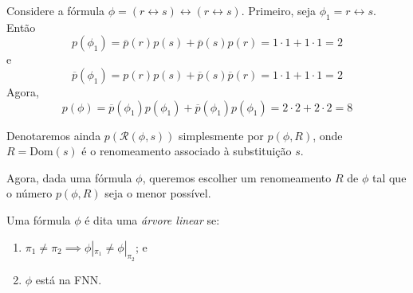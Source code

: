 
\begin{example}
	Considere a fórmula $\phi = (r \leftrightarrow s) \leftrightarrow (r \leftrightarrow s)$. Primeiro, seja $\phi_1 = r \leftrightarrow s$. Então $$p(\phi_1) = \overline{p}(r)p(s) + \overline{p}(s)p(r) = 1 \cdot 1 + 1 \cdot 1 = 2$$ e $$\overline{p}(\phi_1) = p(r)p(s) + \overline{p}(s)\overline{p}(r) = 1 \cdot 1 + 1 \cdot 1 = 2$$ Agora, $$p(\phi) = \overline{p}(\phi_1)p(\phi_1) + \overline{p}(\phi_1)p(\phi_1) = 2 \cdot 2 + 2 \cdot 2 = 8$$
\end{example}

Denotaremos ainda $p(\mathcal{R}(\phi,s))$ simplesmente por $p(\phi,R)$, onde $R = \text{Dom}(s)$ é o renomeamento associado à substituição $s$.

Agora, dada uma fórmula $\phi$, queremos escolher um renomeamento $R$ de $\phi$ tal que o número $p(\phi,R)$ seja o menor possível.

\begin{definition}
	Uma fórmula $\phi$ é dita uma \emph{árvore linear} se:
	\begin{enumerate}
		\item $\pi_1 \neq \pi_2 \implies \phi|_{\pi_1} \neq \phi|_{\pi_2}$; e
		\item $\phi$ está na FNN.
	\end{enumerate}
\end{definition}

